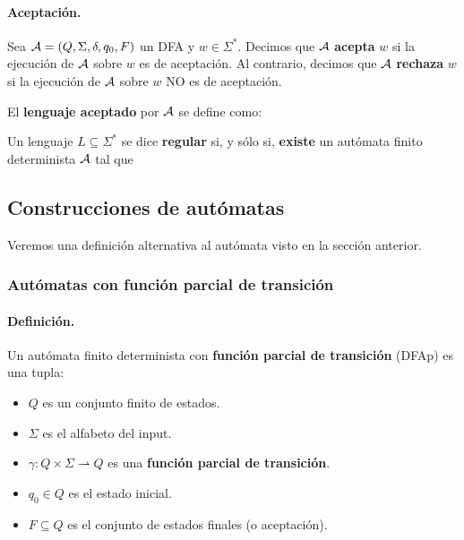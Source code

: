 \paragraph{Aceptación.} Sea $\mathcal{A} = (Q,\Sigma,\delta,q_0,F)$ un DFA y $w \in \Sigma^*$. Decimos que $\mathcal{A}$ \textbf{acepta} $w$ si la ejecución de $\mathcal{A}$ sobre $w$ es de aceptación. Al contrario, decimos que $\mathcal{A}$ \textbf{rechaza} $w$ si la ejecución de $\mathcal{A}$ sobre $w$ NO es de aceptación. \medbreak

El \textbf{lenguaje aceptado} por $\mathcal{A}$ se define como:

Un lenguaje $L \subseteq \Sigma^*$ se dice \textbf{regular} si, y sólo si, \textbf{existe} un autómata finito determinista $\mathcal{A}$ tal que

\subsection{Construcciones de autómatas}

Veremos una definición alternativa al autómata visto en la sección anterior.

\subsubsection{Autómatas con función parcial de transición}

\paragraph{Definición.} Un autómata finito determinista con \textbf{función parcial de transición} (DFAp) es una tupla:

\begin{itemize}

    \item $Q$ es un conjunto finito de estados.
    \item $\Sigma$ es el alfabeto del input.
    \item $\gamma: Q \times \Sigma\rightharpoonup Q$  es una \textbf{función parcial de transición}.
    \item $q_0 \in Q$ es el estado inicial.
    \item $F \subseteq Q$ es el conjunto de estados finales (o aceptación).
\end{itemize}

